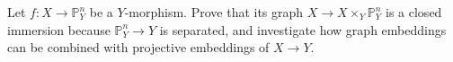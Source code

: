 \begin{problem}\label{chal:vi38-04}
Let \(f:X\to\mathbb P^n_Y\) be a \(Y\)-morphism.  Prove that its graph \(X\to X\times_Y\mathbb P^n_Y\) is a closed immersion because \(\mathbb P^n_Y\to Y\) is separated, and investigate how graph embeddings can be combined with projective embeddings of \(X\to Y\).
\end{problem}
